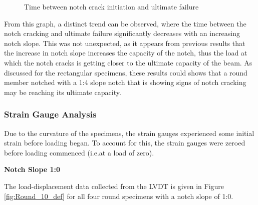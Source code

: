 \documentclass[11pt,a4paper]{article}
\numberwithin{equation}{subsection}
\begin{document}
\begin{figure}[h]
	\begin{center}
	\end{center}
	\caption{Time between notch crack initiation and ultimate failure}
	\label{fig:Round-Crack-fail}
\end{figure}

From this graph, a distinct trend can be observed, where the time between the notch cracking and ultimate failure significantly decreases with an increasing notch slope. This was not unexpected, as it appears from previous results that the increase in notch slope increases the capacity of the notch, thus the load at which the notch cracks is getting closer to the ultimate capacity of the beam. As discussed for the rectangular specimens, these results could shows that a round member notched with a 1:4 slope notch that is showing signs of notch cracking may be reaching its ultimate capacity. 

\subsubsection{Strain Gauge Analysis}
Due to the curvature of the specimens, the strain gauges experienced some initial strain before loading began. To account for this, the strain gauges were zeroed before loading commenced (i.e.at a load of zero).

\pagebreak

\noindent
\textbf{Notch Slope 1:0}\par
\noindent
The load-displacement data collected from the LVDT is given in Figure \ref{fig:Round_10_def} for all four round specimens with a notch slope of 1:0.
\end{document}
